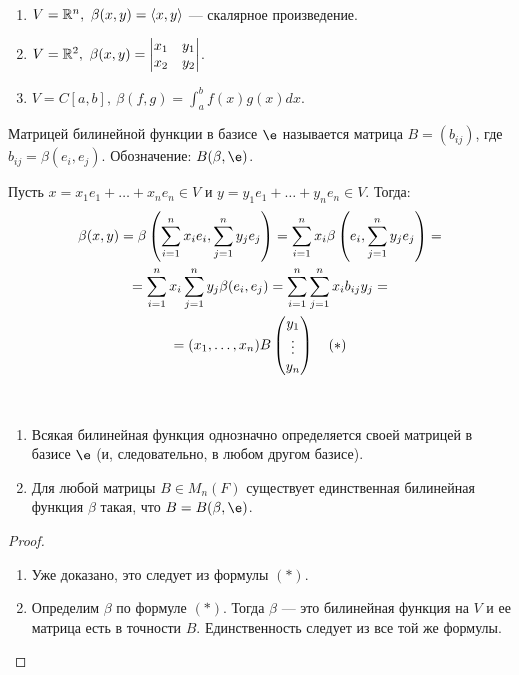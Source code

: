 \begin{Examples}\
\begin{enumerate}
\item $V = \mathbb{R}^n,\ \beta(x, y) = \langle x, y \rangle$ --- скалярное произведение. 
\item $V = \mathbb{R}^2,\ \beta(x, y) = \begin{vmatrix}x_1 & y_1 \\ x_2 & y_2\end{vmatrix}$.
\item $V = C[a, b],\ \beta(f, g) = \int_a^bf(x)g(x)dx$.
\end{enumerate}
\end{Examples}

\begin{Def}
Матрицей билинейной функции в базисе $\e$ называется матрица $B = (b_{ij})$, где $b_{ij} = \beta(e_i, e_j)$. Обозначение: $B(\beta, \e)$.
\end{Def}

Пусть $x = x_1e_1 + \ldots + x_ne_n \in V$ и $y = y_1e_1 + \ldots + y_ne_n \in V$. Тогда:
\begin{gather*}
\beta(x, y) = \beta\left(\sum_{i = 1}^{n}x_ie_i, \sum_{j = 1}^{n}y_je_j\right) = \sum_{i = 1}^{n} x_i\beta\left(e_i, \sum_{j = 1}^{n}y_je_j\right) = \\
= \sum_{i = 1}^{n}x_i\sum_{j = 1}^{n}y_j\beta(e_i, e_j) = \sum_{i = 1}^{n}\sum_{j = 1}^{n}x_ib_{ij}y_j = \\
= (x_1, \ldots, x_n)B \begin{pmatrix}{y}_1 \\\vdots\\{y}_n\end{pmatrix} \quad (*)
\end{gather*}

\begin{Suggestion}\
\begin{enumerate}
\item Всякая билинейная функция однозначно определяется своей матрицей в базисе $\e$ (и, следовательно, в любом другом базисе).
\item Для любой матрицы $B \in M_n(F)$ существует единственная билинейная функция $\beta$ такая, что $B = B(\beta, \e)$.
\end{enumerate}
\end{Suggestion}

\begin{proof}\
\begin{enumerate}
\item Уже доказано, это следует из формулы $(*)$.
\item Определим $\beta$ по формуле $(*)$. Тогда $\beta$ --- это билинейная функция на $V$ и ее матрица есть в точности $B$. Единственность следует из все той же формулы.
\end{enumerate}
\end{proof}

